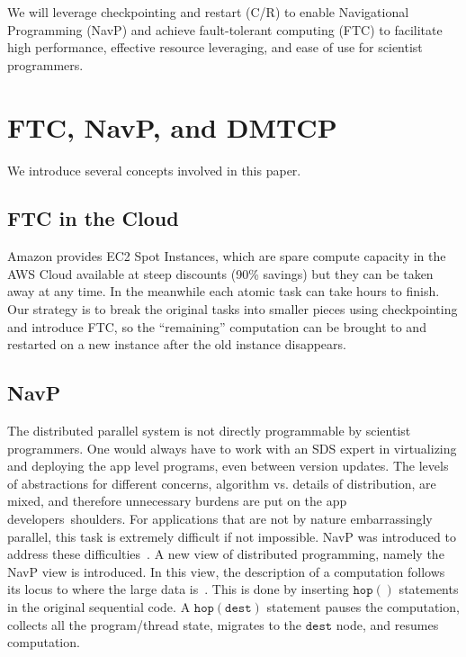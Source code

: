 \documentclass[conference]{IEEEtran}
\begin{document}
We will leverage checkpointing and restart (C/R) to enable Navigational Programming (NavP) and achieve fault-tolerant computing (FTC) to facilitate high performance, effective resource leveraging, and ease of use for scientist programmers.

\section{FTC, NavP, and DMTCP}
\label{sec:s1}
We introduce several concepts involved in this paper.

\subsection{FTC in the Cloud}
\label{subsec:s11}

Amazon provides EC2 Spot Instances, which are spare compute capacity in the AWS Cloud available at steep discounts (90\% savings) but they can be taken away at any time. In the meanwhile each atomic task can take hours to finish. Our strategy is to break the original tasks into smaller pieces using checkpointing and introduce FTC, so the ``remaining'' computation can be brought to and restarted on a new instance after the old instance disappears.

\subsection{NavP}
\label{subsec:s12}

The distributed parallel system is not directly programmable by scientist programmers. One would always have to work with an SDS expert in virtualizing and deploying the app level programs, even between version updates. The levels of abstractions for different concerns, algorithm vs. details of distribution, are mixed, and therefore unnecessary burdens are put on the app developers\textquotesingle\ shoulders. For applications that are not by nature embarrassingly parallel, this task is extremely difficult if not impossible. NavP was introduced to address these difficulties~\cite{pan2004navp}. A new view of distributed programming, namely the NavP view is introduced. In this view, the description of a computation follows its locus to where the large data is~\cite{pan_views_PDCS03}. This is done by inserting  $\mathtt{hop()}$ statements in the original sequential code. A $\mathtt{hop(dest)}$ statement pauses the computation, collects all the program/thread state, migrates to the $\mathtt{dest}$ node, and resumes computation.
\end{document}
